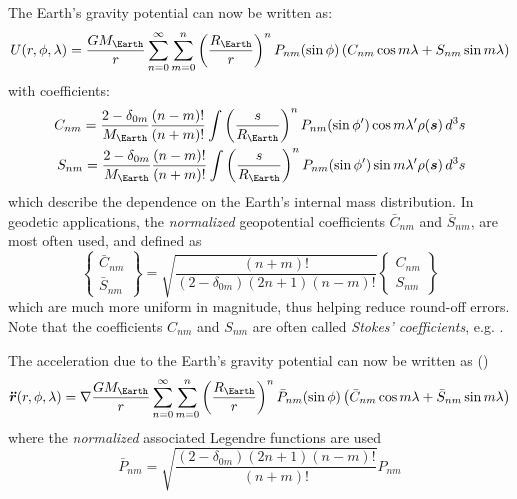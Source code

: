 The Earth's gravity potential can now be written as:
\begin{equation}\label{eq:mont310}
  U (r, \phi, \lambda ) = \frac{G M_{\Earth}}{r} \sum_{n=0}^{\infty} \sum_{m=0}^{n} 
      \left( \frac{R_{\Earth}}{r} \right) ^n P_{nm} (\sin \phi )
      \left( C_{nm} \cos {m\lambda} + S_{nm} \sin{m\lambda} \right)
\end{equation}
with coefficients:
\begin{equation}
  \begin{aligned}
    C_{nm} = \frac{2 - \delta _{0m}}{M_{\Earth}} \frac{(n-m)!}{(n+m)!} 
      \int \left({\frac{s}{R_{\Earth}}}\right)^n P_{nm} (\sin \phi ^\prime) \cos {m\lambda ^\prime} \rho (\bm{s}) \, d^3 s \\
    S_{nm} = \frac{2 - \delta _{0m}}{M_{\Earth}} \frac{(n-m)!}{(n+m)!} 
      \int \left({\frac{s}{R_{\Earth}}}\right)^n P_{nm} (\sin \phi ^\prime) \sin {m\lambda ^\prime} \rho (\bm{s}) \, d^3 s
  \end{aligned}
\end{equation}
which describe the dependence on the Earth's internal mass distribution. In geodetic 
applications, the \emph{normalized} geopotential coefficients $\bar{C}_{nm}$ and 
${\bar{S}}_{nm}$, are most often used, and defined as
\begin{equation}
  \begin{Bmatrix} \bar{C}_{nm} \\ \bar{S}_{nm} \end{Bmatrix} = 
  \sqrt{\frac{(n+m)!}{\left(2-\delta _{0m}\right) \left(2n+1\right) \left(n-m\right)!}}
  \begin{Bmatrix} C_{nm} \\ S_{nm} \end{Bmatrix}
\end{equation}
which are much more uniform in magnitude, thus helping reduce round-off errors.
Note that the coefficients $C_{nm}$ and $S_{nm}$ are often called 
\emph{Stokes' coefficients}, e.g. \cite{Barthelmes2018}.

The acceleration due to the Earth's gravity potential can now be written as  
(\cite{Montenbruck2000})
\begin{equation}\label{eq:mont315}
  \bm{\ddot{r}} (r, \phi, \lambda ) = \nabla \frac{GM_{\Earth}}{r} \sum_{n=0}^{\infty} \sum_{m=0}^{n} 
    \left(\frac{R_{\Earth}}{r}\right) ^n \bar{P}_{nm} (\sin \phi )
    \left( \bar{C}_{nm} \cos{m\lambda} + \bar{S}_{nm} \sin{m\lambda} \right)
\end{equation}
where the \emph{normalized} associated Legendre functions are used
\begin{equation}
  \bar{P}_{nm} = \sqrt{\frac{\left(2-\delta _{0m}\right) \left(2n+1\right) \left(n-m\right)!}{(n+m)!}} P_{nm}
\end{equation}

